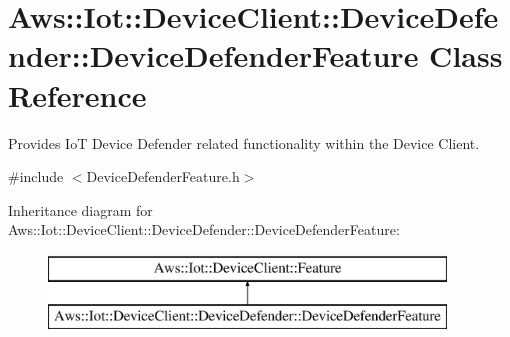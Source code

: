 \hypertarget{class_aws_1_1_iot_1_1_device_client_1_1_device_defender_1_1_device_defender_feature}{}\section{Aws\+:\+:Iot\+:\+:Device\+Client\+:\+:Device\+Defender\+:\+:Device\+Defender\+Feature Class Reference}
\label{class_aws_1_1_iot_1_1_device_client_1_1_device_defender_1_1_device_defender_feature}


Provides IoT Device Defender related functionality within the Device Client.  




{\ttfamily \#include $<$Device\+Defender\+Feature.\+h$>$}

Inheritance diagram for Aws\+:\+:Iot\+:\+:Device\+Client\+:\+:Device\+Defender\+:\+:Device\+Defender\+Feature\+:\begin{figure}[H]
\begin{center}
\leavevmode
\includegraphics[height=2.000000cm]{class_aws_1_1_iot_1_1_device_client_1_1_device_defender_1_1_device_defender_feature}
\end{center}
\end{figure}
